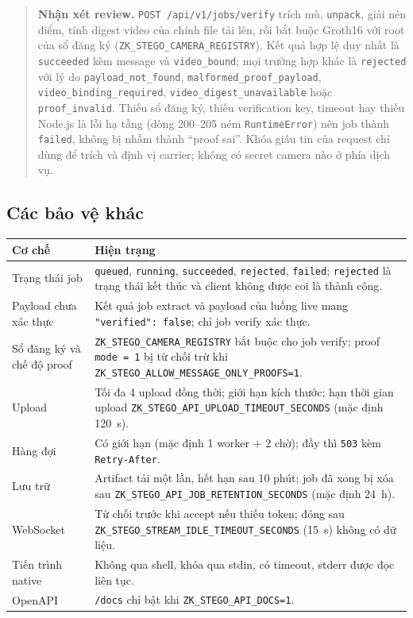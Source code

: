 \documentclass[10pt,a4paper]{article}
\newcommand{\review}[1]{\begin{quote}\colorbox{ReviewBg}{\parbox{0.94\linewidth}{\textbf{Nhận xét review.} #1}}\end{quote}}
\begin{document}
\review{\texttt{POST /api/v1/jobs/verify} trích mù, \texttt{unpack}, giải nén điểm, tính digest video của chính file tải lên, rồi bắt buộc Groth16 với root của sổ đăng ký (\texttt{ZK\_STEGO\_CAMERA\_REGISTRY}). Kết quả hợp lệ duy nhất là \texttt{succeeded} kèm message và \texttt{video\_bound}; mọi trường hợp khác là \texttt{rejected} với lý do \texttt{payload\_not\_found}, \texttt{malformed\_proof\_payload}, \texttt{video\_binding\_required}, \texttt{video\_digest\_unavailable} hoặc \texttt{proof\_invalid}. Thiếu sổ đăng ký, thiếu verification key, timeout hay thiếu Node.js là lỗi hạ tầng (dòng 200--205 ném \texttt{RuntimeError}) nên job thành \texttt{failed}, không bị nhầm thành ``proof sai''. Khóa giấu tin của request chỉ dùng để trích và định vị carrier; không có secret camera nào ở phía dịch vụ.}

\subsection{Các bảo vệ khác}

\begin{longtable}{@{}p{.32\linewidth}p{.62\linewidth}@{}}
\toprule
\textbf{Cơ chế} & \textbf{Hiện trạng}\tabularnewline
\midrule\endhead
Trạng thái job & \texttt{queued}, \texttt{running}, \texttt{succeeded}, \texttt{rejected}, \texttt{failed}; \texttt{rejected} là trạng thái kết thúc và client không được coi là thành công.\\
Payload chưa xác thực & Kết quả job extract và payload của luồng live mang \texttt{"verified": false}; chỉ job verify xác thực.\\
Sổ đăng ký và chế độ proof & \texttt{ZK\_STEGO\_CAMERA\_REGISTRY} bắt buộc cho job verify; proof \texttt{mode = 1} bị từ chối trừ khi \texttt{ZK\_STEGO\_ALLOW\_MESSAGE\_ONLY\_PROOFS=1}.\\
Upload & Tối đa 4 upload đồng thời; giới hạn kích thước; hạn thời gian upload \texttt{ZK\_STEGO\_API\_UPLOAD\_TIMEOUT\_SECONDS} (mặc định 120~s).\\
Hàng đợi & Có giới hạn (mặc định 1 worker + 2 chờ); đầy thì \texttt{503} kèm \texttt{Retry-After}.\\
Lưu trữ & Artifact tải một lần, hết hạn sau 10 phút; job đã xong bị xóa sau \texttt{ZK\_STEGO\_API\_JOB\_RETENTION\_SECONDS} (mặc định 24~h).\\
WebSocket & Từ chối trước khi accept nếu thiếu token; đóng sau \texttt{ZK\_STEGO\_STREAM\_IDLE\_TIMEOUT\_SECONDS} (15~s) không có dữ liệu.\\
Tiến trình native & Không qua shell, khóa qua stdin, có timeout, stderr được đọc liên tục.\\
OpenAPI & \texttt{/docs} chỉ bật khi \texttt{ZK\_STEGO\_API\_DOCS=1}.\\
\bottomrule
\end{longtable}
\end{document}
